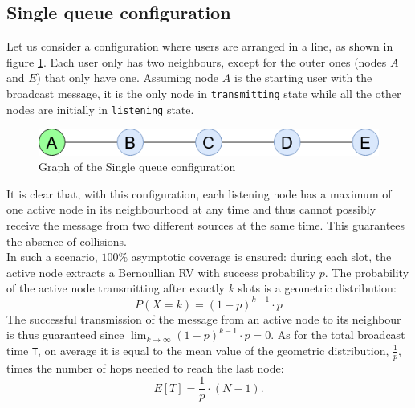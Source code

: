 \subsection{Single queue configuration}\label{ssec:singlequeue}
Let us consider a configuration where users are arranged in a line, as shown in
figure \ref{fig:single_queue_graph}. Each user only has two neighbours, except
for the outer ones (nodes $A$ and $E$) that only have one. Assuming node $A$ is
the starting user with the broadcast message, it is the only node in
\texttt{transmitting} state while all the other nodes are initially in
\texttt{listening} state. 
\begin{figure}[H]
    \begin{center}
        \includegraphics[scale=0.6]{img/single_queue.png}
        \caption{Graph of the Single queue configuration}
        \label{fig:single_queue_graph}
    \end{center}
    \vspace*{-0.4cm}
\end{figure}
\noindent It is clear that, with this configuration, each listening node has a
maximum of one active node in its neighbourhood at any time and thus cannot possibly
receive the message from two different sources at the same time. This guarantees
the absence of collisions.\\
In such a scenario, $100\%$ asymptotic coverage is
ensured: during each slot, the active node extracts a Bernoullian RV with
success probability $p$. The probability of the active node transmitting after
exactly $k$ slots is a geometric distribution:
\begin{equation}
	P(X = k) = (1 - p)^{k-1} \cdot p
	\label{geometricDistribution}
\end{equation}
The successful transmission of the message from an active node to its neighbour
is thus guaranteed since $\lim_{k \to \infty} (1 - p)^{k-1} \cdot p = 0$.
As for the total broadcast time \texttt{T}, on average it is equal to the mean
value of the geometric distribution, $\frac{1}{p}$, times the number of hops
needed to reach the last node:
\begin{equation}
	E[T] = \frac{1}{p} \cdot (N - 1).
	\label{eq:singleQueueMeanT}
\end{equation}
